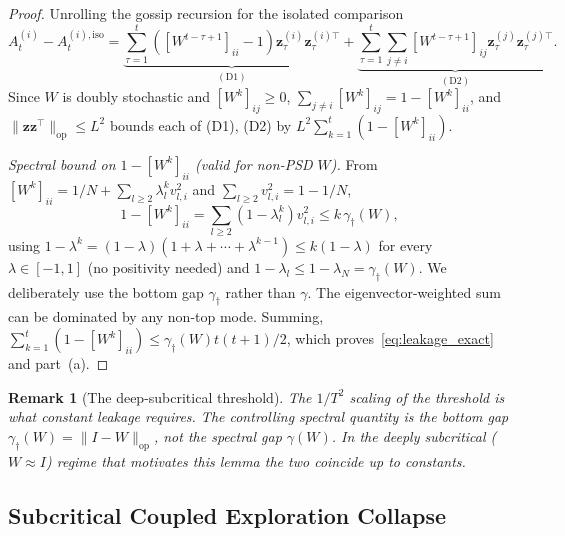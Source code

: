 \documentclass[11pt]{article}
\newtheorem{remark}[theorem]{Remark}
\begin{document}
\begin{proof}
Unrolling the gossip recursion for the isolated comparison \[
A_t^{(i)}-A_t^{(i),\mathrm{iso}}
=\underbrace{\sum_{\tau=1}^t([W^{t-\tau+1}]_{ii}-1)
\bm{z}_\tau^{(i)}\bm{z}_\tau^{(i)\top}}_{\mathrm{(D1)}}
+\underbrace{\sum_{\tau=1}^t\sum_{j\neq i}[W^{t-\tau+1}]_{ij}
\bm{z}_\tau^{(j)}\bm{z}_\tau^{(j)\top}}_{\mathrm{(D2)}}.
\]
Since $W$ is doubly stochastic and $[W^k]_{ij}\geq 0$,
$\sum_{j\neq i}[W^k]_{ij}=1-[W^k]_{ii}$, and
$\|\bm{z}\bm{z}^\top\|_{\mathrm{op}}\leq L^2$ bounds each of (D1), (D2)
by $L^2\sum_{k=1}^t(1-[W^k]_{ii})$.

\textit{Spectral bound on $1-[W^k]_{ii}$ (valid for non-PSD $W$).}
From $[W^k]_{ii}=1/N+\sum_{l\geq 2}\lambda_l^k v_{l,i}^2$
and $\sum_{l\geq 2}v_{l,i}^2=1-1/N$,
\[
1-[W^k]_{ii}=\sum_{l\geq 2}(1-\lambda_l^k)v_{l,i}^2
\leq k\,\gamma_\dagger(W),
\]
using $1-\lambda^k=(1-\lambda)(1+\lambda+\cdots+\lambda^{k-1})
\leq k(1-\lambda)$ for every $\lambda\in[-1,1]$ (no positivity needed)
and $1-\lambda_l\leq 1-\lambda_N=\gamma_\dagger(W)$.  We deliberately
use the bottom gap $\gamma_\dagger$ rather than $\gamma$. The
eigenvector-weighted sum can be dominated by any non-top mode.
Summing, $\sum_{k=1}^t(1-[W^k]_{ii})\leq\gamma_\dagger(W)t(t+1)/2$,
which proves~\eqref{eq:leakage_exact} and part~(a).
\end{proof}

\begin{remark}[The deep-subcritical threshold]
The $1/T^2$ scaling of the threshold is what constant leakage
requires.  The controlling spectral quantity is the \emph{bottom}
gap $\gamma_\dagger(W)=\|I-W\|_{\mathrm{op}}$, not the spectral gap
$\gamma(W)$. In the deeply subcritical ($W\approx I$) regime that
motivates this lemma the two coincide up to constants.
\end{remark}

\subsection{Subcritical Coupled Exploration Collapse}
\end{document}
